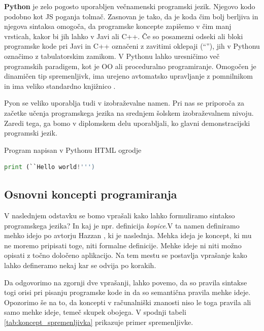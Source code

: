 \textbf{Python} je zelo pogosto uporabljen večnamenski programski
jezik. Njegovo kodo podobno kot JS poganja tolmač. Zasnovan je tako,
da je koda čim bolj berljiva in njegova sintaksa omogoča, da
programske koncepte zapišemo v čim manj vrsticah, kakor bi jih lahko v
Javi ali C++. Če so posamezni odseki ali bloki programske kode pri
Javi in C++ označeni z zavitimi oklepaji (``{}''), jih v Pythonu
označimo z tabulatorskim zamikom. V Pythonu lahko uresničimo več
programskih paradigem, kot je OO ali proceduralno
programiranje. Omogočen je dinamičen tip spremenljivk, ima urejeno
avtomatsko upravljanje z pomnilnikom in ima veliko standardno
knjižnico \cite{wiki:python}.

Pyon se veliko uporablja tudi v izobraževalne namen. Pri nas se
priporoča za začetke učenja programskega jezika na srednjem šolskem
izobraževalnem nivoju. Zaredi tega, ga bomo v diplomskem delu
uporabljali, ko glavni demonstracijski programski jezik.

\begin{examplebox}[label={prog:py01}]{Program napisan v Pythonu
    HTML ogrodje}
\begin{lstlisting}[language=Python]
print (``Hello world!''')
\end{lstlisting}
\end{examplebox}

\subsection{Osnovni koncepti programiranja}
\label{sec:Osnvni koncepti_programiranja}

V naslednjem odstavku se bomo vprašali kako lahko formuliramo sintakso
programskega jezika? In kaj je npr. definicija \emph{kopice}.V ta
namen definiramo mehko idejo po avtorju Hazzan \cite{guideTCS}, ki je
naslednja. Mehka ideja je koncept, ki mu ne moremo pripisati toge,
niti formalne definicije. Mehke ideje ni niti možno opisati z točno
določeno aplikacijo. Na tem mestu se postavlja vprašanje kako lahko
defineramo nekaj kar se odvija po korakih.

Da odgovorimo na zgornji dve vprašanji, lahko povemo, da so pravila
sintakse togi orisi pri pisanju programske kode in da so semantična
pravila mehke ideje. Opozorimo še na to, da koncepti v računalniški
znanosti niso le toga pravila ali samo mehke ideje, temeč skupek
obojega. V spodnji tabeli \ref{tab:koncept_spremenljivka} prikazuje
primer spremenljivke.

